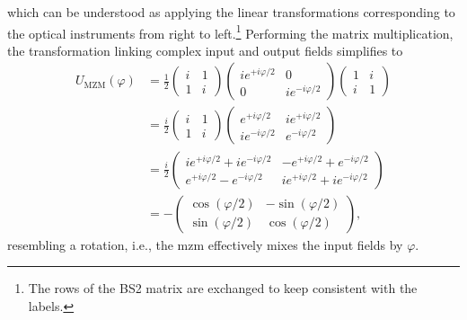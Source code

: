 which can be understood as applying the linear transformations corresponding to the optical instruments from right to left.\footnote{The rows of the BS2 matrix are exchanged to keep consistent with the labels.}
Performing the matrix multiplication, the transformation linking complex input and output fields simplifies to
\begin{align}
    U_\text{MZM}(\varphi)
    &=
    \frac{1}{2}
    \begin{pmatrix}
        i & 1
        \\
        1 & i
    \end{pmatrix}
    \begin{pmatrix}
        ie^{+i\varphi/2} & 0
        \\
        0 & ie^{-i\varphi/2}
    \end{pmatrix}
    \begin{pmatrix}
        1 & i
        \\
        i & 1
    \end{pmatrix}
    \\
    &=
    \frac{i}{2}
    \begin{pmatrix}
        i & 1
        \\
        1 & i
    \end{pmatrix}
    \begin{pmatrix}
        e^{+i\varphi/2} & ie^{+i\varphi/2}
        \\
        ie^{-i\varphi/2} & e^{-i\varphi/2}
    \end{pmatrix}
    \\
    &=
    \frac{i}{2}
    \begin{pmatrix}
        ie^{+i\varphi/2}+ie^{-i\varphi/2} & -e^{+i\varphi/2}+e^{-i\varphi/2}
        \\
        e^{+i\varphi/2}-e^{-i\varphi/2} & ie^{+i\varphi/2}+ie^{-i\varphi/2}
    \end{pmatrix}
    \\
    &=
    -
    \begin{pmatrix}
        \cos(\varphi/2) & -\sin(\varphi/2)
        \\
        \sin(\varphi/2) & \cos(\varphi/2)
    \end{pmatrix}
    \label{eq:mzm_rotation},
\end{align}
resembling a rotation, i.e., the \gls{mzm} effectively mixes the input fields by $\varphi$.

